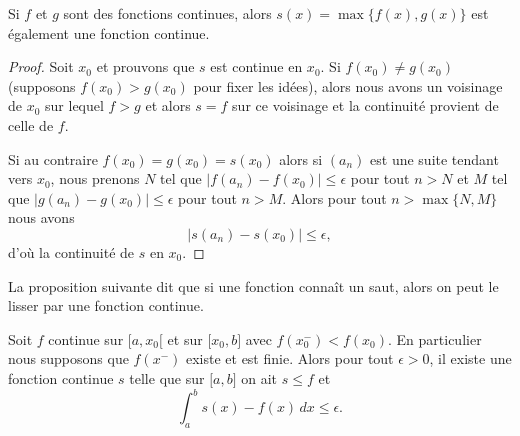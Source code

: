 \begin{lemma}
    Si \( f\) et \( g\) sont des fonctions continues, alors \( s(x)=\max\{ f(x),g(x) \}\) est également une fonction continue.
\end{lemma}

\begin{proof}
    Soit \( x_0\) et prouvons que \( s\) est continue en \( x_0\). Si \( f(x_0)\neq g(x_0)\) (supposons \( f(x_0)>g(x_0)\) pour fixer les idées), alors nous avons un voisinage de \( x_0\) sur lequel \( f>g\) et alors \( s=f\) sur ce voisinage et la continuité provient de celle de \( f\).

    Si au contraire \( f(x_0)=g(x_0)=s(x_0)\) alors si \( (a_n)\) est une suite tendant vers \( x_0\), nous prenons \( N\) tel que \( \big| f(a_n)-f(x_0) \big|\leq \epsilon\) pour tout \( n>N\) et \( M\) tel que \( \big| g(a_n)-g(x_0) \big|\leq \epsilon\) pour tout \( n> M\). Alors pour tout \( n>\max\{ N,M \}\) nous avons
    \begin{equation}
        \big| s(a_n)-s(x_0) \big|\leq \epsilon,
    \end{equation}
    d'où la continuité de \( s\) en \( x_0\).
\end{proof}

La proposition suivante dit que si une fonction connaît un saut, alors on peut le lisser par une fonction continue.
\begin{proposition} \label{PropTIeYVw}
    Soit \( f\) continue sur \( \mathopen[ a , x_0 [\) et sur \( \mathopen[ x_0 , b \mathclose]\) avec \( f(x_0^-)<f(x_0)\). En particulier nous supposons que \( f(x^-)\) existe et est finie. Alors pour tout \( \epsilon>0\), il existe une fonction continue \( s\) telle que sur \( \mathopen[ a , b \mathclose]\) on ait \( s\leq f\) et
    \begin{equation}
        \int_a^bs(x)-f(x)\,dx\leq \epsilon.
    \end{equation}
\end{proposition}

